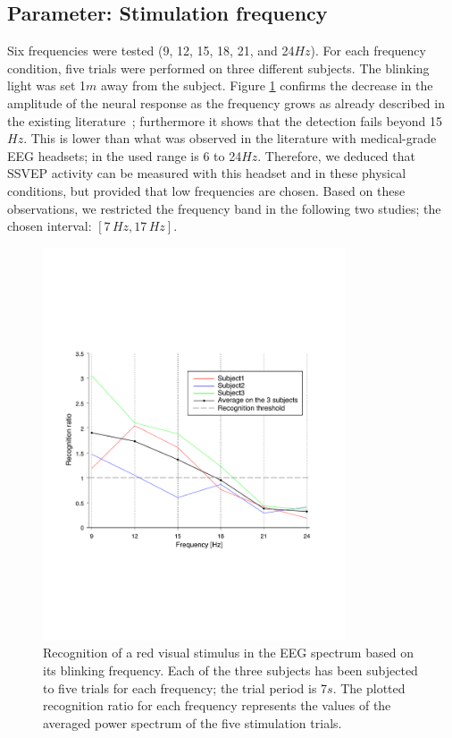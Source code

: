 \documentclass[smallextended]{svjour3}
\begin{document}
\subsection{Parameter: Stimulation frequency}
Six frequencies were tested (9, 12, 15, 18, 21, and 24$Hz$). For each frequency condition, five trials were performed on three different subjects. The blinking light was set 1$m$ away from the subject. Figure \ref{fig:graph-frequences} confirms the decrease in the amplitude of the neural response as the frequency grows as already described in the existing literature~\cite{herrmann2001}; furthermore it shows that the detection fails beyond 15$Hz$. This is lower than what was observed in the literature with medical-grade EEG headsets; in \cite{SSVEPfiability} the used range is 6 to 24$Hz$. Therefore, we deduced that SSVEP activity can be measured with this headset and in these physical conditions, but provided that low frequencies are chosen.
Based on these observations, we restricted the frequency band in the following two studies; the chosen interval: $[7\,\mathit{Hz}, 17\,\mathit{Hz}]$.

\begin{figure}
\center
\includegraphics[width=0.8\textwidth]{figures/graph-frequences.pdf}
\caption{Recognition of a red visual stimulus in the EEG spectrum based on its blinking frequency. Each of the three subjects has been subjected to five trials for each frequency; the trial period is 7$s$. The plotted recognition ratio for each frequency represents the values of the averaged power spectrum of the five stimulation trials.} \label{fig:graph-frequences}
\end{figure}
\end{document}
